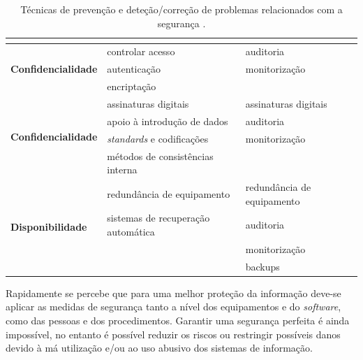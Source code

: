 \documentclass[conference]{IEEEtran}
\begin{document}
\begin{table}[!ht]
\centering
\caption{Técnicas de prevenção e deteção/correção de problemas relacionados com a segurança \cite{segurancaSI}.}
\label{tabl1}
\begin{adjustbox}{max width=\textwidth 	}
\begin{tabular}{ |l|l|l| }

\hline
	\multicolumn{1}{|c|}{\cellcolor[HTML]{EFEFEF}{\color[HTML]{333333}}}	&	\multicolumn{1}{|c|}{\cellcolor[HTML]{EFEFEF}{\color[HTML]{333333} \textbf{Prevenção}}}	&	\multicolumn{1}{|c|}{\cellcolor[HTML]{EFEFEF}{\color[HTML]{333333} \textbf{Deteção/Correção}}}	\\
\hline

\multirow{3}{*}{\textbf{Confidencialidade}}			&	controlar acesso					&	auditoria					\\
													&	autenticação						&	monitorização				\\
													&	encriptação							&								\\
\hline

\multirow{4}{*}{\textbf{Confidencialidade}}			&	assinaturas digitais				&	assinaturas digitais		\\
													&	apoio à introdução de dados			&	auditoria					\\
													&	\textit{standards} e codificações	&	monitorização				\\
													&	métodos de consistências interna	&								\\
\hline

\multirow{4}{*}{\textbf{Disponibilidade}}			&	redundância de equipamento			&	redundância de equipamento	\\
													&	sistemas de recuperação automática	&	auditoria					\\
													&										&	monitorização				\\
													&										&	backups 					\\
\hline

\end{tabular}
\end{adjustbox}
\end{table}

Rapidamente se percebe que para uma melhor proteção da informação deve-se aplicar as medidas de segurança tanto a nível dos equipamentos e do \textit{software}, como das pessoas e dos procedimentos. Garantir uma segurança perfeita é ainda impossível, no entanto é possível reduzir os riscos ou restringir possíveis danos devido à má utilização e/ou ao uso abusivo dos sistemas de informação.
\end{document}
